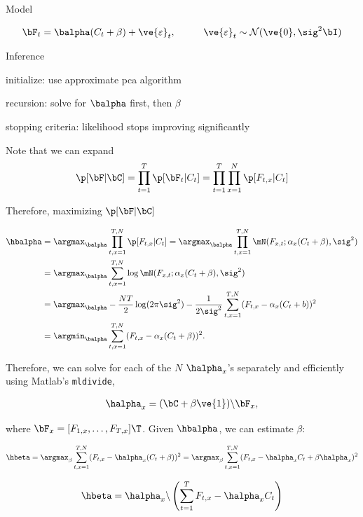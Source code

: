 Model

\begin{align}
\bF_t &= \balpha (C_t + \beta) +  \ve{\varepsilon}_t, \qquad &\ve{\varepsilon}_t \sim \mathcal{N}(\ve{0},\sig^2 \bI)   
\end{align}

Inference

initialize: use approximate pca algorithm

recursion: solve for $\balpha$ first, then $\beta$

stopping criteria: likelihood stops improving significantly

Note that we can expand
\begin{align}
\p[\bF | \bC] 
= \prod_{t=1}^T \p[\bF_t | C_t] 
= \prod_{t=1}^T \prod_{x=1}^N \p[F_{t,x} | C_t] 
\end{align}

Therefore, maximizing $\p[\bF | \bC]$

\begin{align}
\hbalpha 
&= \argmax_{\balpha} \prod_{t,x=1}^{T,N}  \p[F_{t,x} | C_t] 
=  \argmax_{\balpha} \prod_{t,x=1}^{T,N} \mN(F_{x,t}; \alpha_x ( C_t + \beta), \sig^2) \\
&= \argmax_{\balpha} \sum_{t,x=1}^{T,N} \log \mN (F_{x,t}; \alpha_x ( C_t + \beta), \sig^2)  \\
&= \argmax_{\balpha}  -\frac{NT}{2}\log(2\pi \sig^2) -\frac{1}{2\sig^2}\sum_{t,x=1}^{T,N} (F_{t,x} - \alpha_x(C_t + b))^2 \\
&= \argmin_{\balpha} \sum_{t,x=1}^{T,N} (F_{t,x} - \alpha_x(C_t + \beta))^2.
\end{align}

Therefore, we can solve for each of the $N$ $\halpha_x$'s separately and efficiently using Matlab's  \texttt{mldivide}, 

\begin{align}
	\halpha_x = (\bC + \beta\ve{1})\backslash \bF_x,
\end{align}

where $\bF_x=[F_{1,x}, \ldots, F_{T,x}]\T$. Given $\hbalpha$, we can estimate $\beta$:

\begin{align}
\hbeta 
= \argmax_{\beta} \sum_{t,x=1}^{T,N} (F_{t,x} - \halpha_x(C_t + \beta))^2 
= \argmax_{\beta} \sum_{t,x=1}^{T,N} (F_{t,x} - \halpha_x C_t + \beta \halpha_x)^2 
\end{align}

\begin{align}
\hbeta= \halpha_x \backslash \left(\sum_{t=1}^T F_{t,x} - \halpha_x C_t\right)
\end{align}

